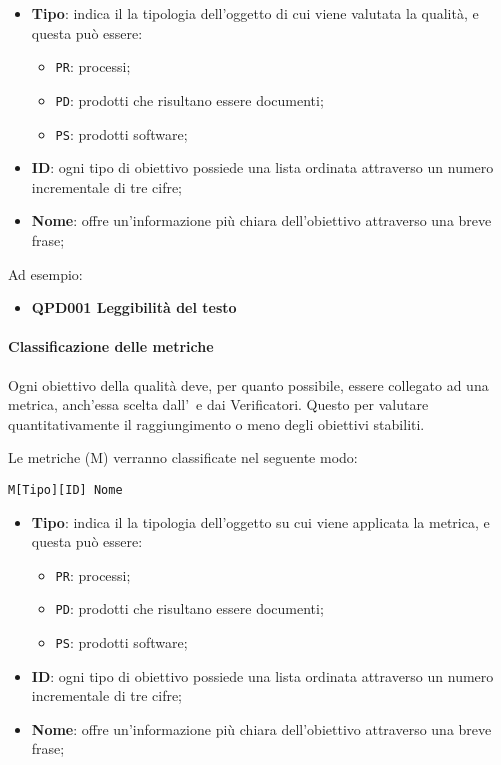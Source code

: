 			\begin{itemize}
				\item \textbf{Tipo}: indica il la tipologia dell'oggetto di cui viene valutata la qualità, e questa può essere:
				\begin{itemize}
					\item \texttt{PR}: processi;
					\item \texttt{PD}: prodotti che risultano essere documenti;
					\item \texttt{PS}: prodotti software;
				\end{itemize}
			
				\item \textbf{ID}: ogni tipo di obiettivo possiede una lista ordinata attraverso un numero incrementale di tre cifre;
				\item \textbf{Nome}: offre un'informazione più chiara dell'obiettivo attraverso una breve frase;
			\end{itemize}
		
			Ad esempio:
			
			\begin{itemize}
				\item \textbf{QPD001 Leggibilità del testo}
			\end{itemize}
			
			
			\paragraph{Classificazione delle metriche}\label{Classificazione metriche}
			Ogni obiettivo della qualità deve, per quanto possibile, essere collegato ad una metrica, anch'essa scelta dall'\Amm\ e dai Verificatori. Questo per valutare
			quantitativamente il raggiungimento o meno degli obiettivi stabiliti.

			Le metriche (M) verranno classificate nel seguente modo:

			\begin{center}
				\texttt{M[Tipo][ID] Nome}
			\end{center}

			\begin{itemize}
				\item \textbf{Tipo}: indica il la tipologia dell'oggetto su cui viene applicata la metrica, e questa può essere:
				\begin{itemize}
					\item \texttt{PR}: processi;
					\item \texttt{PD}: prodotti che risultano essere documenti;
					\item \texttt{PS}: prodotti software;
				\end{itemize}

				\item \textbf{ID}: ogni tipo di obiettivo possiede una lista ordinata attraverso un numero incrementale di tre cifre;
				\item \textbf{Nome}: offre un'informazione più chiara dell'obiettivo attraverso una breve frase;
			\end{itemize}

